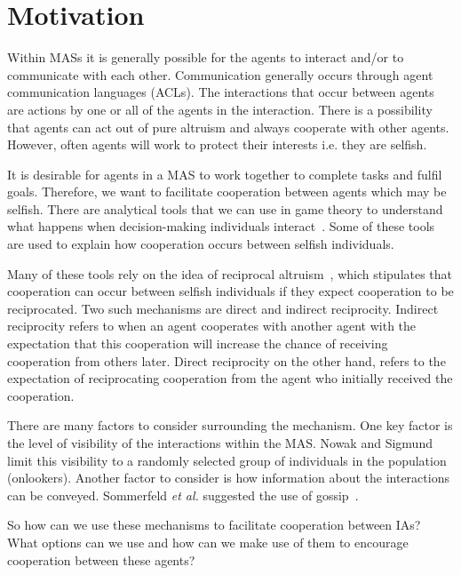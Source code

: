 \documentclass[]{final_report}
\begin{document}
\section{Motivation}
Within MASs it is generally possible for the agents to interact and/or to communicate with each other. Communication generally occurs through agent communication languages (ACLs). The interactions that occur between agents are actions by one or all of the agents in the interaction. There is a possibility that agents can act out of pure altruism and always cooperate with other agents. However, often agents will work to protect their interests i.e. they are selfish.\par
It is desirable for agents in a MAS to work together to complete tasks and fulfil goals. Therefore, we want to facilitate cooperation between agents which may be selfish. There are analytical tools that we can use in game theory to understand what happens when decision-making individuals interact~\cite{myerson2013game}. Some of these tools are used to explain how cooperation occurs between selfish individuals.\par
Many of these tools rely on the idea of reciprocal altruism~\cite{trivers1971evolution}, which stipulates that cooperation can occur between selfish individuals if they expect cooperation to be reciprocated. Two such mechanisms are direct and indirect reciprocity. Indirect reciprocity refers to when an agent cooperates with another agent with the expectation that this cooperation will increase the chance of receiving cooperation from others later. Direct reciprocity on the other hand, refers to the expectation of reciprocating cooperation from the agent who initially received the cooperation.\par
There are many factors to consider surrounding the mechanism. One key factor is the level of visibility of the interactions within the MAS. Nowak and Sigmund~\cite{evol_indirect_image} limit this visibility to a randomly selected group of individuals in the population (onlookers). Another factor to consider is how information about the interactions can be conveyed. Sommerfeld \textit{et al.} suggested the use of gossip~\cite{gossip_alt}.\par 
So how can we use these mechanisms to facilitate cooperation between IAs? What options can we use and how can we make use of them to encourage cooperation between these agents?
\end{document}
